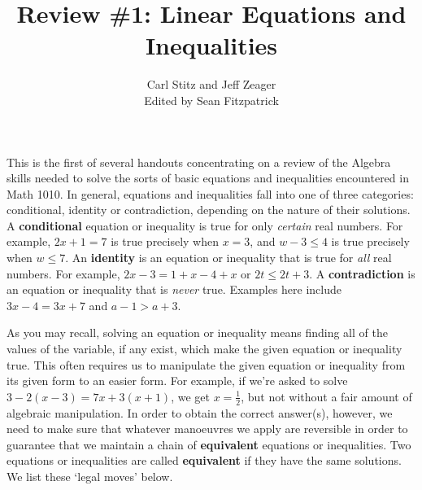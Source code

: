 \documentclass[11pt]{article}
\title{Review \#1: Linear Equations and Inequalities}
\author{Carl Stitz and Jeff Zeager\\
Edited by Sean Fitzpatrick}
\theoremstyle{definition}  %
\begin{document}
\maketitle


\renewcommand{\headrulewidth}{0pt}
\renewcommand{\headheight}{14pt}
\lhead[\fancyplain{}{\sc\thepage}]%
      {\fancyplain{}{\sc \nouppercase{\rightmark}}}
\rhead[\fancyplain{}{\sc \nouppercase{\leftmark}}]%
      {\fancyplain{}{\sc\thepage}}
\cfoot{}


This is the first of several handouts concentrating on a review of the Algebra skills needed to solve the sorts of basic equations and inequalities encountered in Math 1010.  In general, equations and inequalities fall into one of three categories:  conditional, identity or contradiction, depending on the nature of their solutions.  A \textbf{conditional} equation or inequality is true for only \textit{certain} real numbers.  For example, $2x+1 = 7$ is true precisely when $x = 3$, and $w - 3 \leq 4$ is true precisely when $w \leq 7$.  An \textbf{identity} is an equation or inequality that is true for \textit{all} real numbers.  For example, $2x -3 = 1+x-4+x$ or $2t \leq 2t + 3$.  A \textbf{contradiction} is an equation or inequality that is \textit{never} true.  Examples here include $3x - 4 = 3x + 7$ and $a - 1 > a + 3$.  

\smallskip

As you may recall, solving an equation or inequality means finding all of the values of the variable, if any exist, which make the given equation or inequality true.  This often requires us to manipulate the given equation or inequality from its given form to an easier form.  For example, if we're asked to solve $3 - 2(x-3) = 7x + 3(x+1)$, we get $x = \frac{1}{2}$, but not without a fair amount of algebraic manipulation. In order to obtain the correct answer(s), however, we need to make sure that whatever manoeuvres we apply are reversible in order to guarantee that we maintain a chain of \textbf{equivalent} equations or inequalities.  Two equations or inequalities are called \textbf{equivalent} if they have the same solutions.  We list these `legal moves' below.

\medskip

 \label{equivalenteqnineq}
\end{document}
